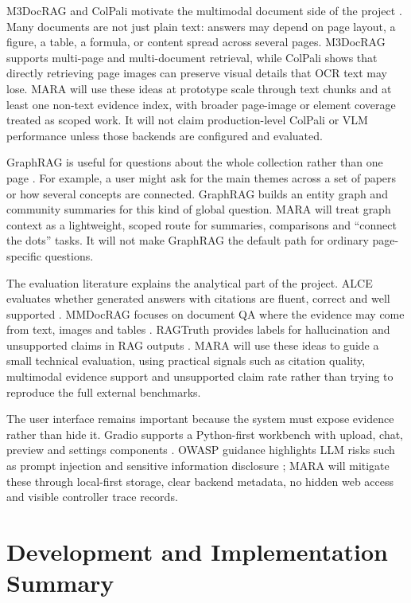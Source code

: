 \documentclass[a4paper,11pt]{article}
\begin{document}
M3DocRAG and ColPali motivate the multimodal document side of the project \cite{cho2024m3docrag, faysse2024colpali}. Many documents are not just plain text: answers may depend on page layout, a figure, a table, a formula, or content spread across several pages. M3DocRAG supports multi-page and multi-document retrieval, while ColPali shows that directly retrieving page images can preserve visual details that OCR text may lose. MARA will use these ideas at prototype scale through text chunks and at least one non-text evidence index, with broader page-image or element coverage treated as scoped work. It will not claim production-level ColPali or VLM performance unless those backends are configured and evaluated.

GraphRAG is useful for questions about the whole collection rather than one page \cite{edge2024graphrag}. For example, a user might ask for the main themes across a set of papers or how several concepts are connected. GraphRAG builds an entity graph and community summaries for this kind of global question. MARA will treat graph context as a lightweight, scoped route for summaries, comparisons and ``connect the dots'' tasks. It will not make GraphRAG the default path for ordinary page-specific questions.

The evaluation literature explains the analytical part of the project. ALCE evaluates whether generated answers with citations are fluent, correct and well supported \cite{gao2023alce}. MMDocRAG focuses on document QA where the evidence may come from text, images and tables \cite{dong2025mmdocrag}. RAGTruth provides labels for hallucination and unsupported claims in RAG outputs \cite{niu2024ragtruth}. MARA will use these ideas to guide a small technical evaluation, using practical signals such as citation quality, multimodal evidence support and unsupported claim rate rather than trying to reproduce the full external benchmarks.

The user interface remains important because the system must expose evidence rather than hide it. Gradio supports a Python-first workbench with upload, chat, preview and settings components \cite{gradioDocs}. OWASP guidance highlights LLM risks such as prompt injection and sensitive information disclosure \cite{owaspLLM}; MARA will mitigate these through local-first storage, clear backend metadata, no hidden web access and visible controller trace records.

\section{Development and Implementation Summary}
\end{document}
